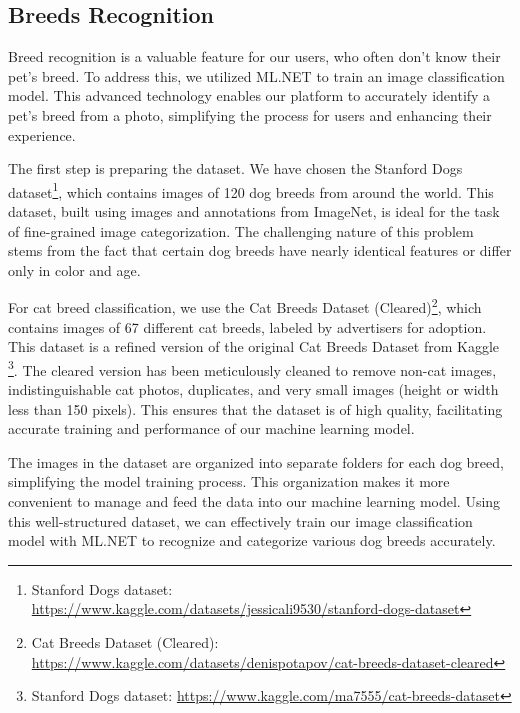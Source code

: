 \subsection{Breeds Recognition}
Breed recognition is a valuable feature for our users, who often don't know their pet's breed. To address this, we utilized ML.NET
to train an image classification model. This advanced technology enables our platform to accurately identify a pet's breed from a photo,
simplifying the process for users and enhancing their experience.

The first step is preparing the dataset. We have chosen the Stanford Dogs dataset\footnote{Stanford Dogs dataset: \url{https://www.kaggle.com/datasets/jessicali9530/stanford-dogs-dataset}}, which contains images of 120 dog breeds from around
the world. This dataset, built using images and annotations from ImageNet, is ideal for the task of fine-grained image categorization.
The challenging nature of this problem stems from the fact that certain dog breeds have nearly identical features or differ only in color and age.

For cat breed classification, we use the Cat Breeds Dataset (Cleared)\footnote{Cat Breeds Dataset (Cleared): \url{https://www.kaggle.com/datasets/denispotapov/cat-breeds-dataset-cleared}}, which contains images of 67 different cat breeds, labeled by advertisers for
adoption. This dataset is a refined version of the original Cat Breeds Dataset from Kaggle \footnote{Stanford Dogs dataset: \url{https://www.kaggle.com/ma7555/cat-breeds-dataset}}.
The cleared version has been meticulously cleaned to remove non-cat images, indistinguishable cat photos, duplicates, and very small images
(height or width less than 150 pixels). This ensures that the dataset is of high quality, facilitating accurate training and performance of our
machine learning model.

The images in the dataset are organized into separate folders for each dog breed, simplifying the model training process. This organization
makes it more convenient to manage and feed the data into our machine learning model. Using this well-structured dataset, we can effectively
train our image classification model with ML.NET to recognize and categorize various dog breeds accurately.

